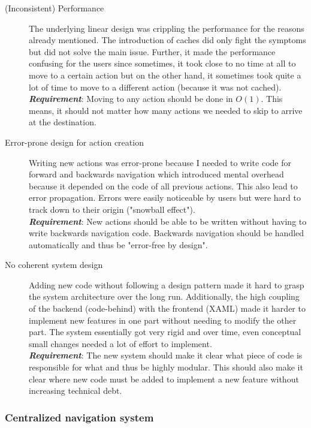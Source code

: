 \begin{description}
\item [(Inconsistent) Performance] The underlying linear design was crippling the performance for the reasons already mentioned. The introduction of caches did only fight the symptoms but did not solve the main issue. Further, it made the performance confusing for the users since sometimes, it took close to no time at all to move to a certain action but on the other hand, it sometimes took quite a lot of time to move to a different action (because it was not cached). \\
\textit{\textbf{Requirement}}: Moving to any action should be done in $O(1)$. This means, it should not matter how many actions we needed to skip to arrive at the destination.
\item [Error-prone design for action creation] Writing new actions was error-prone because I needed to write code for forward and backwards navigation which introduced mental overhead because it depended on the code of all previous actions. This also lead to error propagation. Errors were easily noticeable by users but were hard to track down to their origin ("snowball effect").\\
\textit{\textbf{Requirement}}: New actions should be able to be written without having to write backwards navigation code. Backwards navigation should be handled automatically and thus be "error-free by design".
\item [No coherent system design] Adding new code without following a design pattern made it hard to grasp the system architecture over the long run. Additionally, the high coupling of the backend (code-behind) with the frontend (XAML) made it harder to implement new features in one part without needing to modify the other part. The system essentially got very rigid and over time, even conceptual small changes needed a lot of effort to implement.\\
\textit{\textbf{Requirement}}: The new system should make it clear what piece of code is responsible for what and thus be highly modular. This should also make it clear where new code must be added to implement a new feature without increasing technical debt.
\end{description}

\subsubsection{Centralized navigation system}
